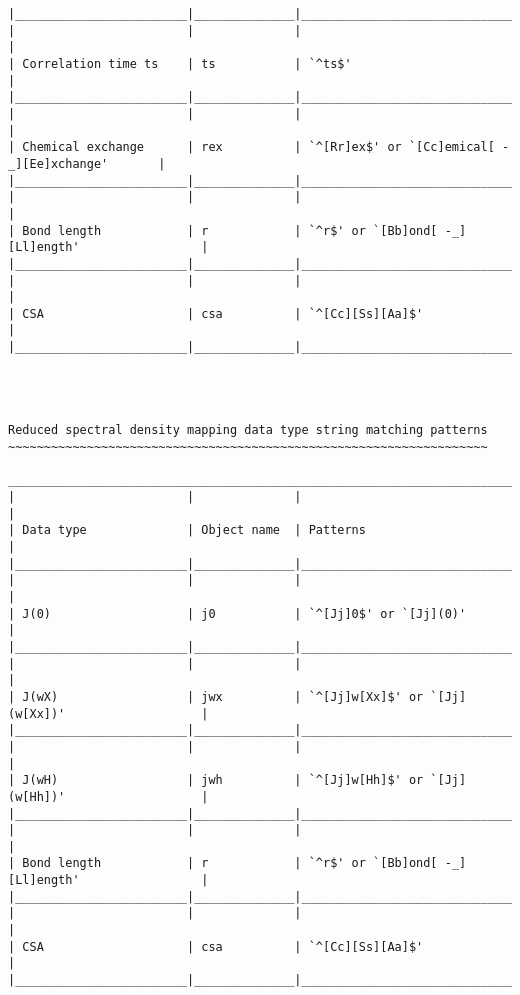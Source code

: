 {\begin{verbatim}
|________________________|______________|__________________________________________________|
|                        |              |                                                  |
| Correlation time ts    | ts           | `^ts$'                                           |
|________________________|______________|__________________________________________________|
|                        |              |                                                  |
| Chemical exchange      | rex          | `^[Rr]ex$' or `[Cc]emical[ -_][Ee]xchange'       |
|________________________|______________|__________________________________________________|
|                        |              |                                                  |
| Bond length            | r            | `^r$' or `[Bb]ond[ -_][Ll]ength'                 |
|________________________|______________|__________________________________________________|
|                        |              |                                                  |
| CSA                    | csa          | `^[Cc][Ss][Aa]$'                                 |
|________________________|______________|__________________________________________________|




Reduced spectral density mapping data type string matching patterns
~~~~~~~~~~~~~~~~~~~~~~~~~~~~~~~~~~~~~~~~~~~~~~~~~~~~~~~~~~~~~~~~~~~

____________________________________________________________________________________________
|                        |              |                                                  |
| Data type              | Object name  | Patterns                                         |
|________________________|______________|__________________________________________________|
|                        |              |                                                  |
| J(0)                   | j0           | `^[Jj]0$' or `[Jj](0)'                           |
|________________________|______________|__________________________________________________|
|                        |              |                                                  |
| J(wX)                  | jwx          | `^[Jj]w[Xx]$' or `[Jj](w[Xx])'                   |
|________________________|______________|__________________________________________________|
|                        |              |                                                  |
| J(wH)                  | jwh          | `^[Jj]w[Hh]$' or `[Jj](w[Hh])'                   |
|________________________|______________|__________________________________________________|
|                        |              |                                                  |
| Bond length            | r            | `^r$' or `[Bb]ond[ -_][Ll]ength'                 |
|________________________|______________|__________________________________________________|
|                        |              |                                                  |
| CSA                    | csa          | `^[Cc][Ss][Aa]$'                                 |
|________________________|______________|__________________________________________________|





\end{verbatim}}
